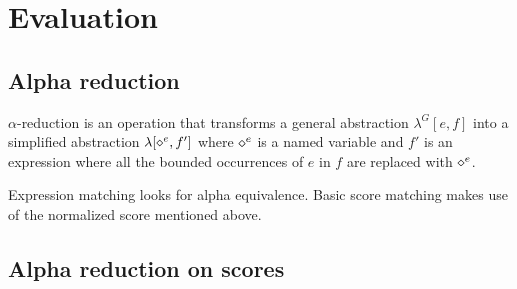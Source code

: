 \documentclass[10pt,a4paper,frenchb]{article}
\begin{document}



\section{Evaluation}

\subsection{Alpha reduction}

$\alpha$-reduction is an operation that transforms a general abstraction $\lambda^G[e,f]$ into a simplified abstraction $\lambda[\diamond^e,f']$ where $\diamond^e$ is a named variable and $f'$ is an expression where all the bounded occurrences of $e$ in $f$ are replaced with $\diamond^e$.

Expression matching looks for alpha equivalence. Basic score matching makes use of the normalized score mentioned above. 

\subsection{Alpha reduction on scores}
\end{document}
